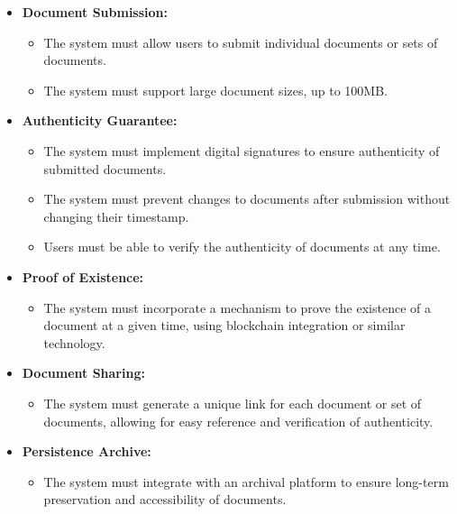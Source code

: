 \documentclass[a4paper,11pt]{article}
\begin{document}
                \begin{itemize}
                    \item \textbf{Document Submission:} 
                    \begin{itemize}
                        \item The system must allow users to submit individual documents or sets of documents.
                        \item The system must support large document sizes, up to 100MB.
                    \end{itemize}
                    
                    \item \textbf{Authenticity Guarantee:} 
                    \begin{itemize}
                        \item The system must implement digital signatures to ensure authenticity of submitted documents.
                        \item The system must prevent changes to documents after submission without changing their timestamp.
                        \item Users must be able to verify the authenticity of documents at any time.
                    \end{itemize}
                    
                    \item \textbf{Proof of Existence:} 
                    \begin{itemize}
                        \item The system must incorporate a mechanism to prove the existence of a document at a given time, using blockchain integration or similar technology.
                    \end{itemize}

                    \pagebreak
                    \item \textbf{Document Sharing:} 
                    \begin{itemize}
                        \item The system must generate a unique link for each document or set of documents, allowing for easy reference and verification of authenticity.
                    \end{itemize}
                    
                    \item \textbf{Persistence Archive:} 
                    \begin{itemize}
                        \item The system must integrate with an archival platform to ensure long-term preservation and accessibility of documents.
                    \end{itemize}
                    

\end{itemize}
\end{document}
